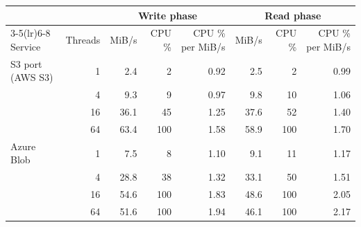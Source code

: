 \begin{tabular}{lrrrrrrr}
\toprule
 & & \multicolumn{3}{c}{Write phase} & \multicolumn{3}{c}{Read phase} \\
\cmidrule(lr){3-5}\cmidrule(lr){6-8}
Service & Threads & MiB/s & CPU \% & CPU \% per MiB/s & MiB/s & CPU \% & CPU \% per MiB/s \\
\midrule
S3 port (AWS S3) & 1 & 2.4 & 2 & 0.92 & 2.5 & 2 & 0.99 \\
 & 4 & 9.3 & 9 & 0.97 & 9.8 & 10 & 1.06 \\
 & 16 & 36.1 & 45 & 1.25 & 37.6 & 52 & 1.40 \\
 & 64 & 63.4 & 100 & 1.58 & 58.9 & 100 & 1.70 \\
\midrule
Azure Blob & 1 & 7.5 & 8 & 1.10 & 9.1 & 11 & 1.17 \\
 & 4 & 28.8 & 38 & 1.32 & 33.1 & 50 & 1.51 \\
 & 16 & 54.6 & 100 & 1.83 & 48.6 & 100 & 2.05 \\
 & 64 & 51.6 & 100 & 1.94 & 46.1 & 100 & 2.17 \\
\bottomrule
\end{tabular}
